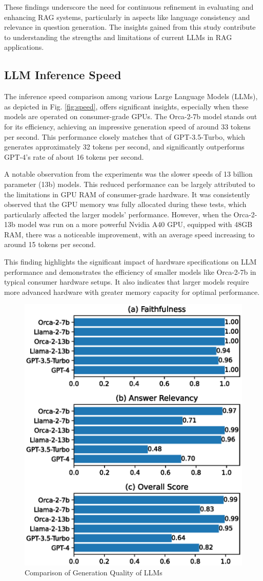 \documentclass[runningheads]{llncs}
\begin{document}
These findings underscore the need for continuous refinement in evaluating and enhancing RAG systems, particularly in aspects like language consistency and relevance in question generation. The insights gained from this study contribute to understanding the strengths and limitations of current LLMs in RAG applications.

\subsection{LLM Inference Speed} 
The inference speed comparison among various Large Language Models (LLMs), as depicted in Fig. \ref{fig:speed}, offers significant insights, especially when these models are operated on consumer-grade GPUs. The Orca-2-7b model stands out for its efficiency, achieving an impressive generation speed of around 33 tokens per second. This performance closely matches that of GPT-3.5-Turbo, which generates approximately 32 tokens per second, and significantly outperforms GPT-4's rate of about 16 tokens per second.

A notable observation from the experiments was the slower speeds of 13 billion parameter (13b) models. This reduced performance can be largely attributed to the limitations in GPU RAM of consumer-grade hardware. It was consistently observed that the GPU memory was fully allocated during these tests, which particularly affected the larger models' performance. However, when the Orca-2-13b model was run on a more powerful Nvidia A40 GPU, equipped with 48GB RAM, there was a noticeable improvement, with an average speed increasing to around 15 tokens per second.

This finding highlights the significant impact of hardware specifications on LLM performance and demonstrates the efficiency of smaller models like Orca-2-7b in typical consumer hardware setups. It also indicates that larger models require more advanced hardware with greater memory capacity for optimal performance.

\begin{figure}
    \centering
    \includegraphics[width=0.6\linewidth]{figures/perf_scores.eps}
    \caption{Comparison of Generation Quality of LLMs}
    \label{fig:perf_scores}
\end{figure}
\end{document}
